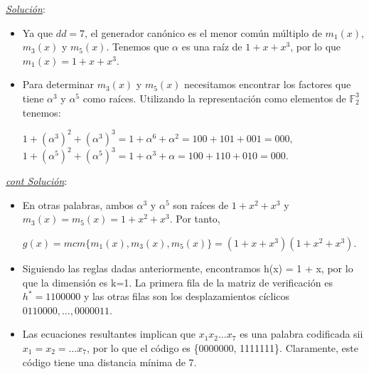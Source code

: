 \begin{frame}  \small  

\textit{\underline{Solución}}:\\

\begin{itemize} 


\item  Ya que $dd = 7$, el generador canónico es el menor común múltiplo de $m_1(x)$,$m_3(x)$ y $m_5(x)$. Tenemos que $\alpha$ es una raíz de $1+x+x^3$, por lo que $m_1(x) = 1+x+x^3$.

\item Para determinar $m_3(x)$ y $m_5(x)$ necesitamos encontrar los factores que tiene $\alpha^3$ y $\alpha^5$ como raíces. Utilizando la representación como elementos de $\mathbb{F}_2^3$ tenemos:

\begin{center}
$1+(\alpha^3)^2 +(\alpha^3)^3 =1+\alpha^6 +\alpha^2 =100+101+001=000,$\\
$1+(\alpha^5)^2 +(\alpha^5)^3 =1+\alpha^3 +\alpha=100+110+010=000.$
\end{center}


\end{itemize} 

\end{frame} 

\begin{frame}  \small  

\textit{\underline{cont Solución}}:\\

\begin{itemize} 

\item En otras palabras, ambos $\alpha^3$ y $\alpha^5$ son raíces de $1+x^2+x^3$ y $m_3(x)=m_5(x)=1+x^2+x^3$. Por tanto,

\begin{center}
$g(x) = mcm \{m_1(x), m_3(x), m_5(x)\} = (1 + x + x^3)(1 + x^2 + x^3).$
\end{center}

 \item Siguiendo las reglas dadas anteriormente, encontramos h(x) = 1 + x, por lo que la dimensión es k=1. La primera fila de la matriz de verificación es $h^* = 1100000$ y las otras filas son los desplazamientos cíclicos $0110000, \ldots, 0000011$. 
 
 \item Las ecuaciones resultantes implican que $x_1x_2\ldots x_7$ es una palabra codificada sii $x_1=x_2=\ldots x_7$, por lo que el código es \{0000000, 1111111\}. Claramente, este código tiene una distancia mínima de 7.

\end{itemize} 

\end{frame} 




